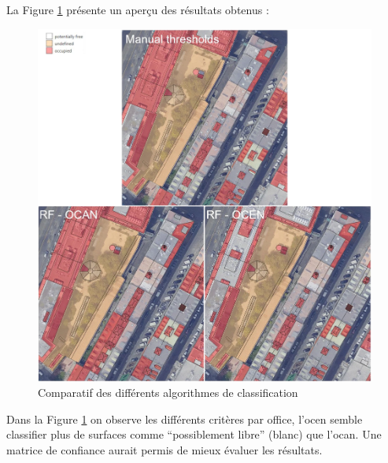 \par{La Figure \ref{fig:stdl_04_rf_resultats} présente un aperçu des résultats obtenus :}
\begin{figure}[H]
    \centering
    \includegraphics[width=1\linewidth]{02-main//figures/ch2/stdl_04_rf_resultats.png}
    \caption{Comparatif des différents algorithmes de classification \cite{herny_detection_2024}}
    \label{fig:stdl_04_rf_resultats}
\end{figure}
\par{Dans la Figure \ref{fig:stdl_04_rf_resultats} on observe les différents critères par office, l'\acrshort{ocen} semble classifier plus de surfaces comme ``possiblement libre'' (blanc) que l'\acrshort{ocan}. Une matrice de confiance aurait permis de mieux évaluer les résultats.}

